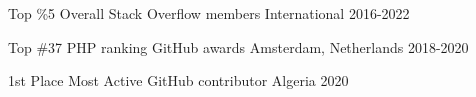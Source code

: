 



\begin{cvhonors}

  \cvhonor
    {Top \%5} %
    {Overall Stack Overflow members} %
    {International} %
    {2016-2022} %

  \cvhonor
    {Top \#37} %
    {PHP ranking GitHub awards} %
    {Amsterdam, Netherlands} %
    {2018-2020} %

\end{cvhonors}




\begin{cvhonors}

  \cvhonor
    {1st Place} %
    {Most Active GitHub contributor} %
    {Algeria} %
    {2020} %

\end{cvhonors}
